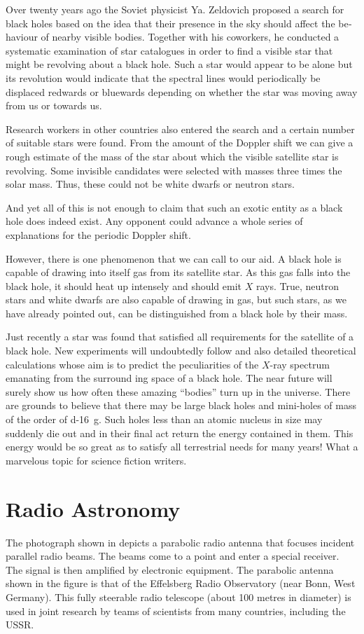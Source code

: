 Over twenty years ago the Soviet physicist Ya. Zeldovich proposed a search for black holes based on the idea that their presence in the sky should affect the be­haviour of nearby visible bodies. Together with his coworkers, he conducted a systematic examination of star catalogues in order to find a visible star that might be revolving about a black hole. Such a star would appear to be alone but its revolution would indicate that the spectral lines would periodically be displaced redwards or bluewards depending on whether the star was moving away from us or towards us.

Research workers in other countries also entered the search and a certain number of suitable stars were found. From the amount of the Doppler shift we can give a rough estimate of the mass of the star about which the visible satellite star is revolving. Some invisible can­didates were selected with masses three times the solar mass. Thus, these could not be white dwarfs or neutron stars.

And yet all of this is not enough to claim that such an exotic entity as a black hole does indeed exist. Any opponent could advance a whole series of explanations for the periodic Doppler shift.

However, there is one phenomenon that we can call to our aid. A black hole is capable of drawing into itself gas from its satellite star. As this gas falls into the black hole, it should heat up intensely and should emit $X$ rays. True, neutron stars and white dwarfs are also capable of drawing in gas, but such stars, as we have already pointed out, can be distinguished from a black hole by their mass.

Just recently a star was found that satisfied all re­quirements for the satellite of a black hole. New experi­ments will undoubtedly follow and also detailed theoret­ical calculations whose aim is to predict the peculiari­ties of the $X$-ray spectrum emanating from the surround­ ing space of a black hole. The near future will surely show us how often these amazing ``bodies'' turn up in the universe. There are grounds to believe that there may be large black holes and mini-holes of mass of the order of \SI{d-16}{\gram}. Such holes less than an atomic nu­cleus in size may suddenly die out and in their final act return the energy contained in them. This energy would be so great as to satisfy all terrestrial needs for many years! What a marvelous topic for science fiction writers.

\section{Radio Astronomy}
The photograph shown in  depicts a parabol­ic radio antenna that focuses incident parallel radio beams. The beams come to a point and enter a special receiver. The signal is then amplified by electronic equip­ment. The parabolic antenna shown in the figure is that of the Effelsberg Radio Observatory (near Bonn, West Germany). This fully steerable radio telescope (about 100 metres in diameter) is used in joint research by teams of scientists from many countries, including the USSR.

